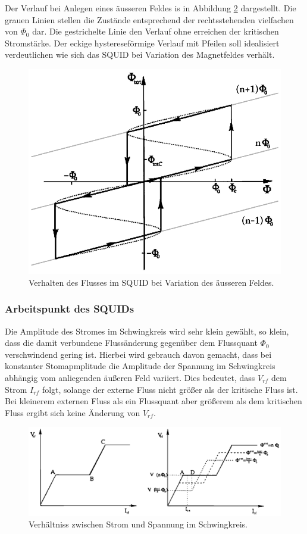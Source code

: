 \documentclass[12pt]{article}
\begin{document}
Der Verlauf bei Anlegen eines äusseren Feldes is in Abbildung \ref{verlauf} dargestellt. Die grauen Linien stellen die Zustände entsprechend der rechtsstehenden vielfachen von $\Phi_0$ dar. Die gestrichelte Linie den Verlauf ohne erreichen der kritischen Stromstärke. Der eckige hystereseförmige Verlauf mit Pfeilen soll idealisiert verdeutlichen wie sich das SQUID bei Variation des Magnetfeldes verhält. 
\begin{figure}[H]
\centering
\includegraphics[width=0.9\linewidth]{pictures/squid_feld_verlauf.eps}
\caption{Verhalten des Flusses im SQUID bei Variation des äusseren Feldes.}
\label{verlauf}
\end{figure}

\subsubsection{Arbeitspunkt des SQUIDs}
Die Amplitude des Stromes im Schwingkreis wird sehr klein gewählt, so klein, dass die damit verbundene Flussänderung gegenüber dem Flussquant 
$\Phi_0$ verschwindend gering ist. Hierbei wird gebrauch davon gemacht, dass bei konstanter Stomapmplitude die Amplitude der Spannung im Schwingkreis abhängig vom anliegenden äußeren Feld variiert. Dies bedeutet, dass $V_{rf}$ dem Strom $I_{rf}$ folgt, solange der externe Fluss
nicht größer als der kritische Fluss ist. Bei kleinerem externen Fluss als ein Flussquant aber größerem
als dem kritischen Fluss ergibt sich keine Änderung von $V_{rf}$. 
\begin{figure}[H]
\centering
\includegraphics[width=0.9\linewidth]{pictures/squid_strom_verlauf.eps}
\caption{Verhältniss zwischen Strom und Spannung im Schwingkreis.}
\label{verlauf}
\end{figure}
\end{document}
